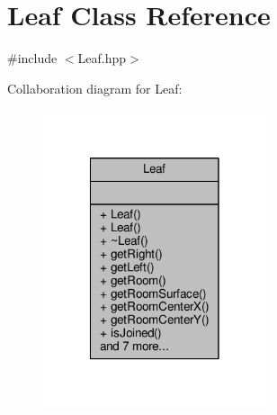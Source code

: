 \hypertarget{class_leaf}{\section{Leaf Class Reference}
\label{class_leaf}
}


{\ttfamily \#include $<$Leaf.\-hpp$>$}



Collaboration diagram for Leaf\-:\nopagebreak
\begin{figure}[H]
\begin{center}
\leavevmode
\includegraphics[width=186pt]{class_leaf__coll__graph}
\end{center}
\end{figure}
